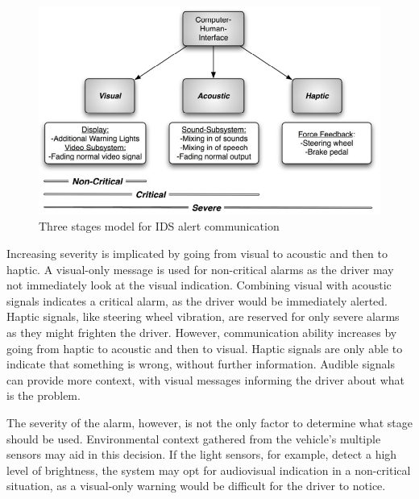 \begin{figure}
    \centering
    \includegraphics[width = \textwidth]{img/parts/app/Adaptive IDS Alarm System.png}
    \caption{Three stages model for IDS alert communication \citep{hoppe2009applying}}
    \label{fig:ids_adaptive_dynamic_reaction}
\end{figure}

Increasing severity is implicated by going from visual to acoustic and then to haptic. A visual-only message is used for non-critical alarms as the driver may not immediately look at the visual indication. Combining visual with acoustic signals indicates a critical alarm, as the driver would be immediately alerted. Haptic signals, like steering wheel vibration, are reserved for only severe alarms as they might frighten the driver. However, communication ability increases by going from haptic to acoustic and then to visual. Haptic signals are only able to indicate that something is wrong, without further information. Audible signals can provide more context, with visual messages informing the driver about what is the problem.\par
The severity of the alarm, however, is not the only factor to determine what stage should be used. Environmental context gathered from the vehicle's multiple sensors may aid in this decision. If the light sensors, for example, detect a high level of brightness, the system may opt for audiovisual indication in a non-critical situation, as a visual-only warning would be difficult for the driver to notice.